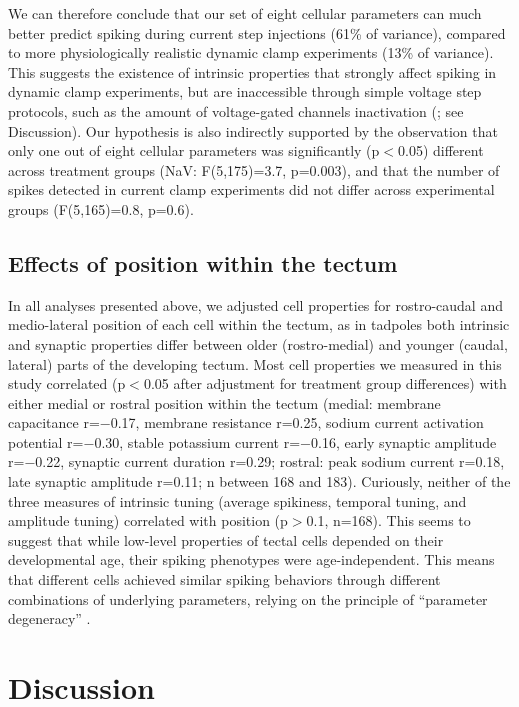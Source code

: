 \documentclass{article}
\begin{document}
We can therefore conclude that our set of eight cellular parameters can much better predict spiking during current step injections (61\% of variance), compared to more physiologically realistic dynamic clamp experiments (13\% of variance). This suggests the existence of intrinsic properties that strongly affect spiking in dynamic clamp experiments, but are inaccessible through simple voltage step protocols, such as the amount of voltage-gated channels inactivation (\citealt{zbili2019axonnav}; see Discussion). Our hypothesis is also indirectly supported by the observation that only one out of eight cellular parameters was significantly (p$<$0.05) different across treatment groups (NaV: F(5,175)=3.7, p=0.003), and that the number of spikes detected in current clamp experiments did not differ across experimental groups (F(5,165)=0.8, p=0.6). 

\subsection*{Effects of position within the tectum}

In all analyses presented above, we adjusted cell properties for rostro-caudal and medio-lateral position of each cell within the tectum, as in tadpoles both intrinsic \citep{hamodi2014} and synaptic properties \citep{wu1996,khakhalin2012} differ between older (rostro-medial) and younger (caudal, lateral) parts of the developing tectum. Most cell properties we measured in this study correlated (p$<$0.05 after adjustment for treatment group differences) with either medial or rostral position within the tectum (medial: membrane capacitance r=$-$0.17, membrane resistance r=0.25, sodium current activation potential r=$-$0.30, stable potassium current r=$-$0.16, early synaptic amplitude r=$-$0.22, synaptic current duration r=0.29; rostral: peak sodium current r=0.18, late synaptic amplitude r=0.11; n between 168 and 183). Curiously, neither of the three measures of intrinsic tuning (average spikiness, temporal tuning, and amplitude tuning) correlated with position (p$>$0.1, n=168). This seems to suggest that while low-level properties of tectal cells depended on their developmental age, their spiking phenotypes were age-independent. This means that different cells achieved similar spiking behaviors through different combinations of underlying parameters, relying on the principle of “parameter degeneracy” \citep{prinz2004degeneracy,drion2015}.


\section*{Discussion}
\end{document}
